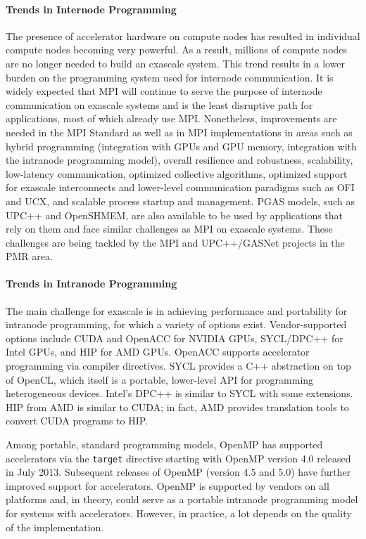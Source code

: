 \paragraph{Trends in Internode Programming}
The presence of accelerator hardware on compute nodes has resulted in individual
compute nodes becoming very powerful. As a result, millions of compute
nodes are no longer needed to build an exascale system. This trend
results in a lower burden on the programming system used for internode
communication. It is widely expected that MPI will continue to serve
the purpose of internode communication on exascale systems and is the
least disruptive path for applications, most of which already use
MPI. Nonetheless, improvements are needed in the MPI Standard as well
as in MPI implementations in areas such as hybrid programming
(integration with GPUs and GPU memory, integration with the intranode
programming model), overall resilience and robustness, scalability,
low-latency communication, optimized collective algorithms, optimized support
for exascale interconnects and lower-level communication paradigms
such as OFI and UCX, and scalable process startup and management. PGAS
models, such as UPC++ and OpenSHMEM, are also available to be used by
applications that rely on them and face similar
challenges as MPI on exascale systems. These challenges are being tackled by the MPI and
UPC++/GASNet projects in the PMR area.

\paragraph{Trends in Intranode Programming}
The main challenge for exascale is in achieving performance and portability for
intranode programming, for which a variety of options
exist. Vendor-supported options include CUDA and OpenACC for NVIDIA
GPUs, SYCL/DPC++ for Intel GPUs, and HIP for AMD GPUs. OpenACC
supports accelerator programming via compiler directives. SYCL
provides a C++ abstraction on top of OpenCL, which itself is a
portable, lower-level API for programming heterogeneous
devices. Intel's DPC++ is similar to SYCL with some extensions. HIP
from AMD is similar to CUDA; in fact, AMD provides translation tools
to convert CUDA programs to HIP.

Among portable, standard programming models, OpenMP has supported
accelerators via the \texttt{target} directive starting with OpenMP version
4.0 released in July 2013. Subsequent releases of OpenMP (version 4.5
and 5.0) have further improved support for accelerators. OpenMP is
supported by vendors on all platforms and, in theory, could serve as a
portable intranode programming model for systems with
accelerators. However, in practice, a lot depends on the quality of
the implementation.

